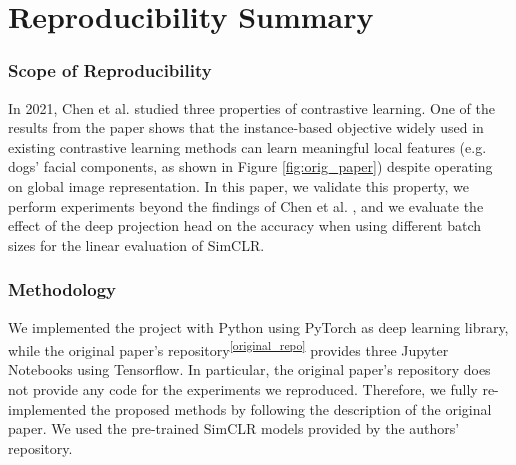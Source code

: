 \section*{\centering Reproducibility Summary}


\subsubsection*{Scope of Reproducibility}

In 2021, Chen et al. \cite{chen2021intriguing} studied three properties of contrastive learning. One of the results from the paper shows that the instance-based objective widely used in existing contrastive learning methods can learn meaningful local features (e.g. dogs' facial components, as shown in Figure \ref{fig:orig_paper}) despite operating on global image representation. In this paper, we validate this property, we perform experiments beyond the findings of Chen et al. \cite{chen2021intriguing}, and we evaluate the effect of the deep projection head on the accuracy when using different batch sizes for the linear evaluation of SimCLR.


\subsubsection*{Methodology}
We implemented the project with Python using PyTorch as deep learning library, while the original paper's repository\textsuperscript{\ref{original_repo}} provides three Jupyter Notebooks using Tensorflow. In particular, the original paper's repository does not provide any code for the experiments we reproduced.
Therefore, we fully re-implemented the proposed methods by following the description of the original paper. We used the pre-trained SimCLR models provided by the authors' repository.


